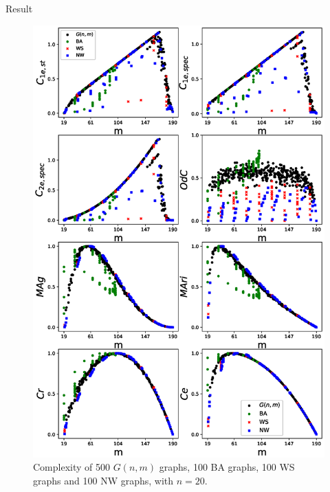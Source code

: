 \documentclass{beamer}
\begin{document}
    \begin{frame}{Result}
        \centering
        \vspace{-15mm}
        \begin{figure}
            \includegraphics[width=\textwidth,height=\textheight,keepaspectratio]{complexities_sp.eps}
            \vspace{-8mm}
            \caption{Complexity of 500 $G(n,m)$ graphs, 100 BA graphs, 100 WS graphs and 100 NW graphs, with $n=20$.}
        \end{figure}
    \end{frame}
\end{document}
